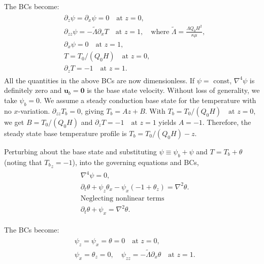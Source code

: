 \documentclass{article}
\begin{document}
The BCs become:
\begin{align}\label{eq:marangoni_convect_bcs_dimless}
 \begin{split}
  & \partial_{z}\psi = \partial_{x}\psi = 0 \quad \textrm{at } z = 0,\\
  & \partial_{zz} \psi = -\tilde{\Lambda}\partial_{x}T 
  \quad \textrm{at } z = 1, \quad \textrm{where } \tilde{\Lambda} = \frac{\Lambda Q_{0}H^{2}}{\kappa \mu},\\
  & \partial_{x}\psi = 0 \quad \textrm{at } z = 1, \\
  & T=T_{0}/(Q_{0}H) \quad \textrm{at } z = 0, \\
  & \partial_{z}T = -1 \quad \textrm{at } z = 1.
 \end{split}
\end{align}
All the quantities in the above BCs are now dimensionless. If $\psi = \textrm{ const}$, $\nabla^{4}\psi$ is definitely zero and $\boldsymbol{u}_{b}=\boldsymbol{0}$ is the base state velocity. Without loss of generality, we take $\boxed{\psi_{b} = 0}$. 
We assume a steady conduction base state for the temperature with no $x$-variation. $\partial_{zz}T_{b} = 0$, giving $T_{b} = Az + B$. With $T_{b}= T_{0}/(Q_{0}H) \quad \textrm{at } z = 0$, we get $B =T_{0}/(Q_{0}H)$ and $\partial_{z}T = -1 \quad \textrm{at } z = 1$ yields $A=-1$. Therefore, the steady state base temperature profile is $\boxed{T_{b} = T_{0}/(Q_{0}H) - z}$.  

Perturbing about the base state and substituting $\psi \equiv \psi_{b} + \psi$ and $T = T_{b} + \theta$ (noting that ${T_{b}}_{z} = -1$), into the governing equations and BCs,
\begin{align}\label{eq:perturbation_eqns}
 \begin{split}
  & \boxed{\nabla^{4}\psi = 0},\\
  & \partial_{t}\theta + \psi_{z}\theta_{x} - \psi_{x}(-1 + \theta_{z}) = \nabla^{2}\theta. \\
  & \textrm{Neglecting nonlinear terms}\\
  &\boxed{\partial_{t}\theta + \psi_{x} = \nabla^{2}\theta}.
 \end{split}
\end{align}

The BCs become:
\begin{align}
\label{eq:perturbation_bcs}
 \begin{split}
  &\boxed{ \psi_{z} = \psi_{x} = \theta = 0} \quad \textrm{at } z = 0,  \\
  & \boxed{ \psi_{x} = \theta_{z} = 0, \quad \psi_{zz} = -\tilde{\Lambda} \partial_{x}\theta} \quad \textrm{at } z = 1. 
 \end{split}
\end{align}
\end{document}
